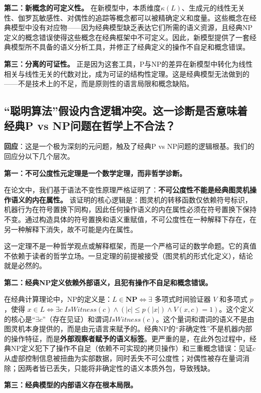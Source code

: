 \documentclass{ctexart}
\begin{document}
	\textbf{第二：新概念的可定义性。} 在新模型中，本质维度$\kappa(L)$、生成元的线性无关性、伽罗瓦敏感性、对偶性的追踪等概念都可以被精确定义和度量。这些概念在经典模型中没有对应物——因为经典模型缺乏表达它们所需的语义资源，且经典NP定义的概念错误使得这些概念在经典框架中不可定义。因此，新模型提供了一套经典模型所不具备的语义分析工具，并修正了经典定义的操作不自足和概念错误。
	
	\textbf{第三：分离的可证性。} 正是因为这套工具，P与NP的差异在新模型中转化为线性相关与线性无关的代数对比，成为可证的结构性定理。这是经典模型无法做到的——不是技术上的不足，而是原则性的语言局限和概念缺陷。
	
	
	\subsection{``聪明算法''假设内含逻辑冲突。这一诊断是否意味着经典P vs NP问题在哲学上不合法？}
	
	\textbf{回应}：这是一个极为深刻的元问题，触及了经典P vs NP问题的逻辑根基。我们的回应分以下几个层次。
	
	\textbf{第一：不可公度性元定理是一个数学定理，而非哲学诊断。}
	
	在论文\cite{philo2026,models2026}中，我们基于语法不变性原理严格证明了：\textbf{不可公度性不能是经典图灵机操作语义的内在属性。} 该证明的核心逻辑是：图灵机的转移函数仅依赖符号标识，机器行为在符号置换下同构，因此任何操作语义的内在属性必须在符号置换下保持不变。通过构造具体的符号置换和语义重赋值，不可公度性在一种解释下存在，在另一种解释下消失，故不可能是内在属性。
	
	这一定理不是一种哲学观点或解释框架，而是一个严格可证的数学命题。它的真值不依赖于读者的哲学立场。一旦定理的前提被接受（图灵机的形式化定义），结论就是必然的。
	
	\textbf{第二：经典NP定义依赖外部语义，且犯有操作不自足和概念错误。}
	
	在经典计算理论中，NP的定义是：$L \in \mathbf{NP} \iff \exists$ 多项式时间验证器 $V$ 和多项式 $p$，使得 $x \in L \iff \exists c \; IsWitness(c) \land (|c| \le p(|x|) \land V(x,c)=1)$。这个定义的核心是``$\exists c$''（存在见证）和谓词$IsWitness(c)$。这个量词和谓词的语义不是由图灵机本身提供的，而是由元语言来赋予的。经典NP的``非确定性''不是机器内部的操作特征，而是\textbf{外部观察者赋予的语义标签}。更严重的是，在此外包过程中，经典NP定义犯下了操作不自足（依赖不可实现的拷贝操作）和三重概念错误：见证$c$从虚部控制信息被扭曲为实部数据，同时丢失不可公度性；对偶性被存在量词消除；因两者皆已丢失，只能将非确定性的语义本质外包，导致残缺。
	
	\textbf{第三：经典模型的内部语义存在根本局限。}
	
\end{document}
